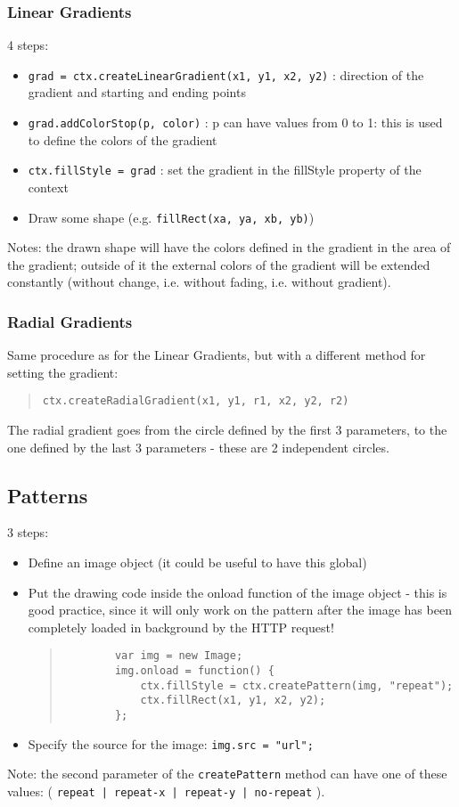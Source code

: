 \documentclass[a4paper,11pt]{book}
\begin{document}
\subsubsection{Linear Gradients}
4 steps:
\begin{itemize}
\item \texttt{grad = ctx.createLinearGradient(x1, y1, x2, y2)} : direction of the gradient and starting and ending points
\item \texttt{grad.addColorStop(p, color)} : p can have values from 0 to 1: this is used to define the colors of the gradient
\item \texttt{ctx.fillStyle = grad} : set the gradient in the fillStyle property of the context
\item Draw some shape (e.g. \texttt{fillRect(xa, ya, xb, yb)})
\end{itemize}
Notes: the drawn shape will have the colors defined in the gradient in the area of the gradient; outside of it
the external colors of the gradient will be extended constantly (without change, i.e. without fading, i.e. without gradient).
\subsubsection{Radial Gradients}
Same procedure as for the Linear Gradients, but with a different method
for setting the gradient:
\begin{verse}
\texttt{ctx.createRadialGradient(x1, y1, r1, x2, y2, r2)} \end{verse}
The radial gradient goes from the circle defined by the first
3 parameters, to the one defined by the last 3 parameters - these are 2 independent circles.

\subsection{Patterns}
3 steps:
\begin{itemize}
\item Define an image object (it could be useful to have this global)
\item Put the drawing code inside the onload function of the image object - this is good practice, since it will only
		work on the pattern after the image has been completely loaded in background by the HTTP request!
		\begin{verse}
		\begin{verbatim}
		var img = new Image;
		img.onload = function() {
			ctx.fillStyle = ctx.createPattern(img, "repeat");
			ctx.fillRect(x1, y1, x2, y2);
		};
		\end{verbatim}
		\end{verse}
\item Specify the source for the image: \texttt{img.src = "url";}
\end{itemize}
Note: the second parameter of the \texttt{createPattern} method can have one of these values: (
\texttt{repeat | repeat-x | repeat-y | no-repeat} ).
\end{document}
